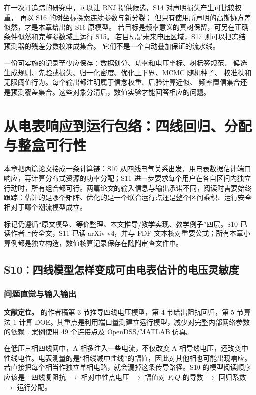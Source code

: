 \documentclass[UTF8,11pt,fontset=fandol,openany,oneside]{ctexbook}
\theoremstyle{definition}
\theoremstyle{remark}
\numberwithin{equation}{chapter}
\begin{document}
在一次可追踪的研究中，可以让 RNJ 提供候选，S14 对声明损失产生可比较权重，
再以 S16 的树坐标探索连续参数与新分裂；
但只有使用所声明的高斯协方差似然，才是本章给出的 S16 原模型。
若目标是频率意义的真树保留，可另在正确条件似然和完整参数域上运行 S15。
若目标是未来电压区域，S17 则可以把冻结预测器的残差分数校准成集合。
它们不是一个自动叠加保证的流水线。

一份可实施的记录至少应保存：数据划分、功率和电压坐标、树标签规范、
候选生成规则、先验或损失、归一化密度、优化上下界、MCMC 随机种子、
校准秩和无限阈值行为。每个输出都注明属于信念权重、后验计算近似、
频率置信集合还是预测覆盖集合。这些对象分清后，数值实验才能回答相应的问题。



\chapter{从电表响应到运行包络：四线回归、分配与整盒可行性}
\label{ch:operating_envelopes}

本章把两篇论文接成一条计算链：S10 从四线电气关系出发，用电表数据估计端口响应，再计算分布式资源的功率分配；S11 进一步要求每个用户在各自区间内独立行动时，所有组合都可行。两篇论文的输入信息与输出承诺不同，阅读时需要始终跟踪：估计的是哪个矩阵、优化的是一个联合运行点还是整个区间乘积、运行安全相对于哪个潮流模型成立。

标记仍遵循“原文模型、等价整理、本文推导/教学实现、教学例子”四层。S10 已读作者上传全文，S11 已读 arXiv v4，并与 PDF 文本核对重要公式；所有本章小算例都是独立构造，数值核算记录保存在随附审查文件中。

\section{S10：四线模型怎样变成可由电表估计的电压灵敏度}
\label{sec:oe_s10}

\subsection{问题直觉与输入输出}

\textbf{文献定位。}\citet{S10} 的作者稿第 3 节推导四线电压模型，第 4 节给出阻抗回归，第 5 节算法 1 计算 DOE。其重点是利用端口量测建立运行模型，减少对完整内部网络参数的依赖；案例使用 49 个连接点及 OpenDSS/MATLAB 仿真。

在低压三相四线网中，A 相多注入一些电流，不仅改变 A 相导线电压，还改变中性线电位。电表测量的是“相线减中性线”的幅值，因此对其他相也可能出现响应。若直接把每个相当作独立单相电路，就会漏掉这条传导路径。S10 的模型阅读顺序应该是：四线复阻抗 $\to$ 相对中性点电压 $\to$ 幅值对 $P,Q$ 的导数 $\to$ 回归系数 $\to$ 运行分配。
\end{document}
